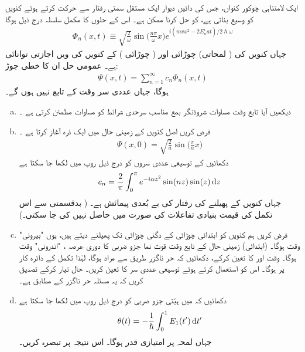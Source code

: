 ایک لامتناہی چوکور کنواں،  جس کی دائیں دیوار ایک مستقل سمتی رفتار  سے حرکت کرتے ہوئے کنویں کو وسیع بناتی ہے،  کو    حل کرنا ممکن ہے۔  اس کے حلوں کا مکمل سلسلہ درج ذیل ہوگا 
\begin{align}\label{مساوات_حر_مکمل_حل_چوکور_کنواں}
\Phi_n (x, t) \equiv \sqrt{\frac{2}{\omega}} \sin \big ( \frac{n \pi}{\omega} x \big ) e^{i(mvx^2 -2E_n^i at)/2\hslash \omega}
\end{align}
جہاں  کنویں کی ( لمحاتی)  چوڑائی اور   ( چوڑائی ) کے   کنویں کی  ویں اجازتی   توانائی  ہے۔ عمومی حل ان  کا  خطی جوڑ:
\begin{align}
\Psi (x, t) = \sum_{n = 1}^{\infty} c_n \Phi_n (x, t)
\end{align}
ہوگا،  جہاں عددی سر  وقت  کے تابع نہیں ہوں گے۔
\begin{enumerate}[a.]
\item
دیکھیں آیا تابع وقت مساوات شروڈنگر بمع مناسب سرحدی شرائط کو مساوات     مطمئن کرتی ہے ۔
\item
فرض کریں اصل کنویں کے  زمینی حال میں ایک ذرہ آغاز   کرتا ہے  ۔
\begin{align*}
\Psi (x, 0) = \sqrt{\frac{2}{a}} \sin \big ( \frac{\pi}{a} x \big )
\end{align*}
دکھائیں کے  توسیعی   عددی سروں کو درج ذیل روپ میں لکھا جا سکتا ہے 
\begin{align}
c_n = \frac{2}{\pi} \int_0^{\pi} e^{-i\alpha z^2} \sin(nz) \sin(z) \dif z
\end{align}
جہاں  کنویں کے پھیلنے کی رفتار کی  بے بُعدی پیمائش ہے۔ ( بدقسمتی سے اس تکمل کی قیمت  بنیادی تفاعلات کی صورت میں حاصل نہیں کی جا سکتی۔) 
\item
فرض کریں ہم کنویں کو ابتدائی چوڑائی کے دگنی چوڑائی تک پھیلنے دیتے ہیں،  یوں  "بیرونی"  وقت  ہوگا۔  (ابتدائی)  زمینی حال کے تابع وقت قوت نما  جزو ضربی کا دوری عرصہ ،   "اندرونی" وقت ہوگا۔ وقت  اور  کا  تعین کرکے،  دکھائیں  کہ  حر ناگزر   طریق  سے مراد  ہوگا،  لہٰذا  تکمل کے
 دائرہ کار پر  ہوگا۔ اس کو استعمال کرتے ہوئے  توسیعی  عددی سر  کا  تعین کریں۔  حال  تیار کرکے تصدیق کریں کہ یہ مسئلہ حر ناگزر کے مطابق ہے۔
\item
دکھائیں کہ   میں    ہیّتی جزو ضربی  کو درج ذیل روپ میں لکھا جا سکتا ہے 
\begin{align}
\theta (t) = - \frac{1}{\hslash} \int_0^1 E_1 (t') \dif t'
\end{align}
جہاں لمحہ  پر   امتیازی قدر  ہوگا۔ اس نتیجہ پر تبصرہ کریں۔
\end{enumerate}
